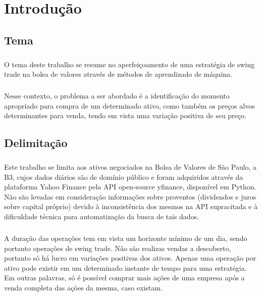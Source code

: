 \chapter{Introdução}
\label{cap1}

\section{Tema}

\paragraph{} O tema deste trabalho se resume no aperfeiçoamento de uma estratégia de swing trade na bolsa de valores através de métodos de aprendizado de máquina.

\paragraph{} Nesse contexto, o problema a ser abordado é a identificação do momento apropriado para compra de um determinado ativo, como também os preços alvos determinantes para venda, tendo em vista uma variação positiva de seu preço.


\section{Delimitação}

\paragraph{} Este trabalho se limita aos ativos negociados na Bolsa de Valores de São Paulo, a B3, cujos dados diários são de domínio público e foram adquiridos através da plataforma Yahoo Finance pela API open-source yfinance, disponível em Python. Não são levadas em consideração informações sobre proventos (dividendos e juros sobre capital próprio) devido à inconsistência dos mesmos na API supracitada e à dificuldade técnica para automatização da busca de tais dados.

\paragraph{} A duração das operações tem em vista um horizonte mínimo de um dia, sendo portanto operações de swing trade. Não são realizas vendas a descoberto, portanto só há lucro em variações positivas dos ativos. Apenas uma operação por ativo pode existir em um determinado instante de tempo para uma estratégia. Em outras palavras, só é possível comprar mais ações de uma empresa após a venda completa das ações da mesma, caso existam.

